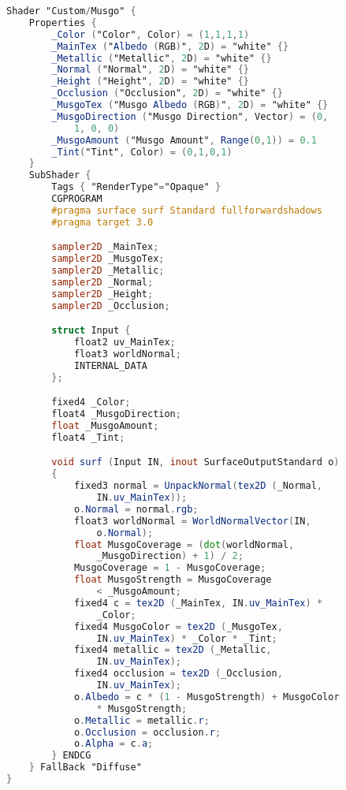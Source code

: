 \label{an:codigo-fonte-musgo-unity}



\begin{lstlisting}[language=GLSL, caption={\label{cf:musgo} \textit{Shader} de efeito de musgo na Unity}]
Shader "Custom/Musgo" {
	Properties {
		_Color ("Color", Color) = (1,1,1,1)
		_MainTex ("Albedo (RGB)", 2D) = "white" {}
		_Metallic ("Metallic", 2D) = "white" {}
		_Normal ("Normal", 2D) = "white" {}
		_Height ("Height", 2D) = "white" {}
		_Occlusion ("Occlusion", 2D) = "white" {}
		_MusgoTex ("Musgo Albedo (RGB)", 2D) = "white" {}
		_MusgoDirection ("Musgo Direction", Vector) = (0, 
			1, 0, 0)
		_MusgoAmount ("Musgo Amount", Range(0,1)) = 0.1
		_Tint("Tint", Color) = (0,1,0,1)
	}
	SubShader {
		Tags { "RenderType"="Opaque" }
		CGPROGRAM
		#pragma surface surf Standard fullforwardshadows
		#pragma target 3.0

		sampler2D _MainTex;
		sampler2D _MusgoTex;
		sampler2D _Metallic;
		sampler2D _Normal;
		sampler2D _Height;
		sampler2D _Occlusion;

		struct Input {
			float2 uv_MainTex;
			float3 worldNormal;
			INTERNAL_DATA
		};

		fixed4 _Color;
		float4 _MusgoDirection;
		float _MusgoAmount;
		float4 _Tint;

		void surf (Input IN, inout SurfaceOutputStandard o) 
		{
			fixed3 normal = UnpackNormal(tex2D (_Normal, 
				IN.uv_MainTex));
			o.Normal = normal.rgb;
			float3 worldNormal = WorldNormalVector(IN, 
				o.Normal);
			float MusgoCoverage = (dot(worldNormal, 
				_MusgoDirection) + 1) / 2;
			MusgoCoverage = 1 - MusgoCoverage;
			float MusgoStrength = MusgoCoverage 
				< _MusgoAmount;
			fixed4 c = tex2D (_MainTex, IN.uv_MainTex) * 
				_Color;
			fixed4 MusgoColor = tex2D (_MusgoTex, 
				IN.uv_MainTex) * _Color * _Tint;
			fixed4 metallic = tex2D (_Metallic, 
				IN.uv_MainTex);
			fixed4 occlusion = tex2D (_Occlusion, 
				IN.uv_MainTex);
			o.Albedo = c * (1 - MusgoStrength) + MusgoColor 
				* MusgoStrength;
			o.Metallic = metallic.r;
			o.Occlusion = occlusion.r;
			o.Alpha = c.a;
		} ENDCG
	} FallBack "Diffuse"
}	
\end{lstlisting}

\nocite{wronski2021}

